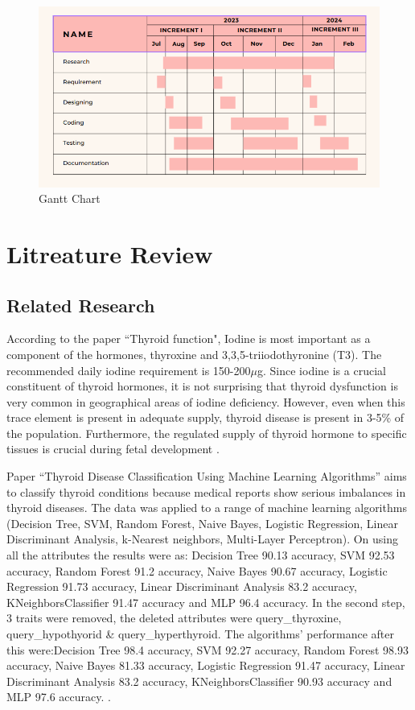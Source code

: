 

\begin{figure}[h]
    \centering
    \includegraphics[scale=0.55]{ganttchart.png}
    \caption{Gantt Chart}
    \label{fig:my_label}
\end{figure}



\chapter{Litreature Review}

 

\section{Related Research}
According to the paper ``Thyroid function", Iodine is most important as a component of the hormones, thyroxine and 3,3,5-triiodothyronine (T3). The recommended daily iodine requirement is 150-200\(\mu\)g. Since iodine is a crucial constituent of thyroid hormones, it is not surprising that thyroid dysfunction is very common in geographical areas of iodine deficiency. However, even when this trace element is present in adequate supply, thyroid disease is present in 3-5\% of the population. Furthermore, the regulated supply of thyroid hormone to specific tissues is crucial during fetal development \cite{arthur_beckett_1999}.

Paper ``Thyroid Disease Classification Using Machine Learning Algorithms” aims to classify thyroid conditions because medical reports show serious imbalances in thyroid diseases. The data was applied to a range of machine learning algorithms (Decision Tree, SVM, Random Forest, Naive Bayes, Logistic Regression, Linear Discriminant Analysis, k-Nearest neighbors, Multi-Layer Perceptron). On using all the attributes the results were as: Decision Tree 90.13 accuracy, SVM 92.53 accuracy, Random Forest 91.2 accuracy, Naive Bayes 90.67 accuracy, Logistic Regression 91.73 accuracy, Linear Discriminant Analysis 83.2 accuracy, KNeighborsClassifier 91.47 accuracy and MLP 96.4 accuracy. In the second step, 3 traits were removed, the deleted attributes were query\_thyroxine, query\_hypothyorid \& query\_hyperthyroid. The algorithms’ performance after this were:Decision Tree 98.4 accuracy, SVM 92.27 accuracy, Random Forest 98.93 accuracy, Naive Bayes 81.33 accuracy, Logistic Regression 91.47 accuracy, Linear Discriminant Analysis 83.2 accuracy, KNeighborsClassifier 90.93 accuracy and MLP 97.6 accuracy. \cite{salman_2021}.

